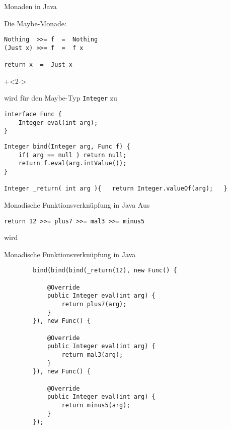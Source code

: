 \begin{frame}[fragile]{Monaden in Java}

Die Maybe-Monade:

\begin{lstlisting}
Nothing  >>= f  =  Nothing
(Just x) >>= f  =  f x

return x  =  Just x
\end{lstlisting}

\onslide+<2->

wird für den Maybe-Typ \lstinline|Integer| zu

\begin{lstlisting}
interface Func {
    Integer eval(int arg);
}
\end{lstlisting}

\begin{lstlisting}
Integer bind(Integer arg, Func f) {
    if( arg == null ) return null;
    return f.eval(arg.intValue());
}

Integer _return( int arg ){   return Integer.valueOf(arg);   }
\end{lstlisting}
\end{frame}


\begin{frame}[fragile]{Monadische Funktionsverknüpfung in Java}
Aus
\begin{lstlisting}
return 12 >>= plus7 >>= mal3 >>= minus5
\end{lstlisting}

wird
\end{frame}

\begin{frame}[fragile]{Monadische Funktionsverknüpfung in Java}
\begin{lstlisting}
		bind(bind(bind(_return(12), new Func() {

			@Override
			public Integer eval(int arg) {
				return plus7(arg);
			}
		}), new Func() {

			@Override
			public Integer eval(int arg) {
				return mal3(arg);
			}
		}), new Func() {

			@Override
			public Integer eval(int arg) {
				return minus5(arg);
			}
		});
\end{lstlisting}
\end{frame}





